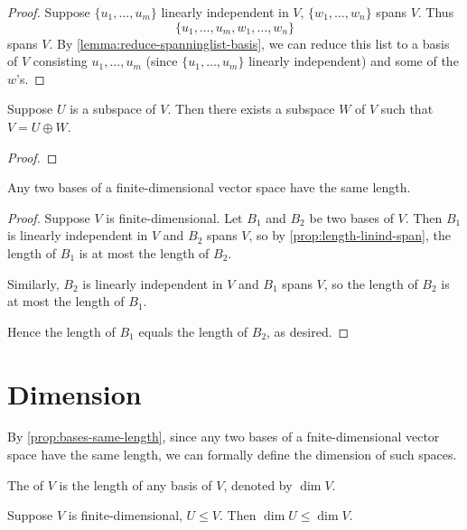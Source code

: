 \begin{proof}
Suppose $\{u_1,\dots,u_m\}$ linearly independent in $V$, $\{w_1,\dots,w_n\}$ spans $V$. Thus
\[\{u_1,\dots,u_m,w_1,\dots,w_n\}\]
spans $V$. By \cref{lemma:reduce-spanninglist-basis}, we can reduce this list to a basis of $V$ consisting $u_1,\dots,u_m$ (since $\{u_1,\dots,u_m\}$ linearly independent) and some of the $w$'s.
\end{proof}

\begin{proposition}
Suppose $U$ is a subspace of $V$. Then there exists a subspace $W$ of $V$ such that $V=U\oplus W$.
\end{proposition}

\begin{proof}

\end{proof}

\begin{proposition}\label{prop:bases-same-length}
Any two bases of a finite-dimensional vector space have the same length.
\end{proposition}

\begin{proof}
Suppose $V$ is finite-dimensional. Let $B_1$ and $B_2$ be two bases of $V$. Then $B_1$ is linearly independent in $V$ and $B_2$ spans $V$, so by \cref{prop:length-linind-span}, the length of $B_1$ is at most the length of $B_2$.

Similarly, $B_2$ is linearly independent in $V$ and $B_1$ spans $V$, so the length of $B_2$ is at most the length of $B_1$.

Hence the length of $B_1$ equals the length of $B_2$, as desired.
\end{proof}

\section{Dimension}
By \cref{prop:bases-same-length}, since any two bases of a fnite-dimensional vector space have the same length, we can formally define the dimension of such spaces.

\begin{definition}[Dimension]
The  of $V$ is the length of any basis of $V$, denoted by $\dim V$.
\end{definition}

\begin{proposition}
Suppose $V$ is finite-dimensional, $U\le V$. Then $\dim U\le\dim V$.
\end{proposition}

